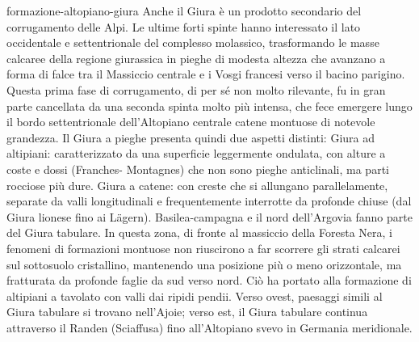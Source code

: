 \documentclass[preview]{standalone}
\begin{document}
\begin{snippet}{formazione-altopiano-giura}
    Anche il Giura è un prodotto secondario del corrugamento delle Alpi. Le ultime forti spinte hanno
    interessato il lato occidentale e settentrionale del complesso molassico, trasformando le masse
    calcaree della regione giurassica in pieghe di modesta altezza che avanzano a forma di falce tra il
    Massiccio centrale e i Vosgi francesi verso il bacino parigino. Questa prima fase di corrugamento, di
    per sé non molto rilevante, fu in gran parte cancellata da una seconda spinta molto più intensa,
    che fece emergere lungo il bordo settentrionale dell'Altopiano centrale catene montuose di
    notevole grandezza. Il Giura a pieghe presenta quindi due aspetti distinti: Giura ad altipiani:
    caratterizzato da una superficie leggermente ondulata, con alture a coste e dossi (Franches-
    Montagnes) che non sono pieghe anticlinali, ma parti rocciose più dure. Giura a catene: con creste
    che si allungano parallelamente, separate da valli longitudinali e frequentemente interrotte da
    profonde chiuse (dal Giura lionese fino ai Lägern). Basilea-campagna e il nord dell'Argovia fanno
    parte del Giura tabulare. In questa zona, di fronte al massiccio della Foresta Nera, i fenomeni di
    formazioni montuose non riuscirono a far scorrere gli strati calcarei sul sottosuolo cristallino,
    mantenendo una posizione più o meno orizzontale, ma fratturata da profonde faglie da sud verso
    nord. Ciò ha portato alla formazione di altipiani a tavolato con valli dai ripidi pendii. Verso ovest,
    paesaggi simili al Giura tabulare si trovano nell'Ajoie; verso est, il Giura tabulare continua
    attraverso il Randen (Sciaffusa) fino all'Altopiano svevo in Germania meridionale.
\end{snippet}
\end{document}
